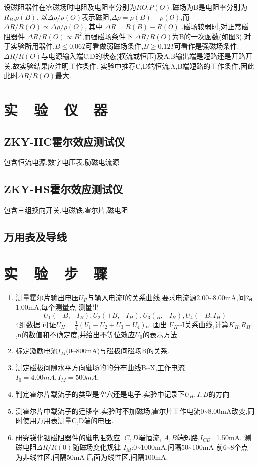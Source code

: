 \documentclass{thuemp}
\begin{document}
设磁阻器件在零磁场时电阻及电阻率分别为$R{O}$,$P(O)$,磁场为B是电阻率分别为$R_{B}$,$\rho(B)$.
以$ \Delta \rho/\rho(O) $表示磁阻,$ \Delta \rho = \rho (B) - \rho(O) $,而$\Delta R /R(O) \propto \Delta \rho /\rho(O)$,
其中
$ \Delta R = R(B)-R(O) $
.磁场较弱时,对正常磁阻器件
$\Delta R /R(O)\propto B^{2}$,而强磁场条件下
$ \Delta R /R(O)$为B的一次函数(如图3).对于实验所用器件,$ B \leq 0.06T$可看做弱磁场条件,$B\geq 0.12T$可看作是强磁场条件.$\Delta R / R(O)$与电源输入端C,D的状态(横流或恒压)及A,B输出端是短路还是开路开关,故实验结果应注明工作条件.
实验中推荐C,D端恒流,A,B端短路的工作条件,因此此时$\Delta R/R(O)$最大.
\section{实~~验~~仪~~器}
\subsection{ZKY-HC霍尔效应测试仪}
包含恒流电源,数字电压表,励磁电流源
\subsection{ZKY-HS霍尔效应测试仪}
包含三组换向开关,电磁铁,霍尔片,磁电阻
\subsection{万用表及导线}
\section{实~~验~~步~~骤} 
\begin{enumerate}
	\item 测量霍尔片输出电压$U_{H}$与输入电流I的关系曲线,要求电流源2.00\~{}8.00mA,间隔1.00mA,每个测量点
	测量出$$U_{1}(+B,+I_H{}),U_{2}(+B,-I_{H}),U_{3}(_B,-I_{H}),U_{4}(-B,I_{H})$$
	4组数据.可证$U_{H}=\frac{1}{4}(U_{1}-U_{2}+U_{3}-U_{4})$。画出
	$U_{H}$\~{}I关系曲线,计算$K_{H}$,$R_{H}$,n的数值和不确定度,并给出不等位效应$U_{0}$的表示方法.
	\item 标定激励电流$I_{M}$(0\~{}800mA)与磁极间磁场B的关系.
	\item 测定磁极间隙水平方向磁场的的分布曲线B\~{}X,工作电流$ I_{0}=4.00mA,I_{M}=500mA $.
	\item 判定霍尔片载流子的类型是空穴还是电子.实验中记录下$ U_{H},I,B $的方向
	\item 测霍尔片中载流子的迁移率.实验时不加磁场,霍尔片工作电流0\~{}8.00mA改变,同时使用万用表测量C,D端的电压.
	\item 研究锑化铟磁阻器件的磁电阻效应. $C,D$端恒流, $A,B$端短路,$ I_{CD} $=1.50mA.
	\subitem 测磁电阻$ \Delta R/R(0) $随磁场变化规律
	\subitem $ I_{M} $:0\~{}1000mA,间隔50\~{}100mA
	\subitem 前6\~{}8个点为非线性区,间隔50mA
	\subitem 后面为线性区,间隔100mA.
\end{enumerate}
\end{document}
